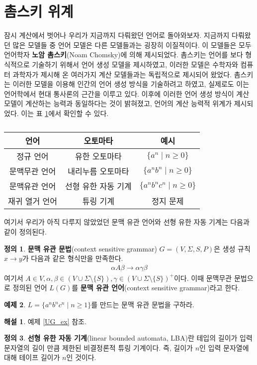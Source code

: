 \documentclass[b5paper, 11pt]{book}
\theoremstyle{definition}
\newtheorem{defn}{정의}[chapter]
\newtheorem{ex}[defn]{예제}
\newtheorem*{ans*}{해설}
\begin{document}
\section{촘스키 위계}
잠시 계산에서 벗어나 우리가 지금까지 다뤄왔던 언어로 돌아와보자. 지금까지 다뤄왔던 많은 모델들 중
언어 모델은 다른 모델들과는 굉장히 이질적이다. 이 모델들은 모두 
언어학자 \textbf{노암 촘스키}(Noam Chomsky)에 의해 제시되었다. 촘스키는 언어를 보다 형식적으로
기술하기 위해서 언어 생성 모델을 제시하였고, 이러한 모델은 수학자와 컴퓨터 과학자가 제시해 온 여러가지 계산 모델들과는 독립적으로 제시되어 왔었다. 촘스키는 이러한 모델을 이용해 인간의 언어 생성 방식을 기술하려고 하였고, 실제로도 이는 언어학에서 현대 통사론의 근간을 이루고 있다. 이후에 이러한 언어 생성 방식이 계산 모델이 계산하는 능력과 동일하다는 것이 밝혀졌고, 언어의 계산 능력적 위계가 제시되었다. 이는 표 \ref{chomsky hierarchy}에서 확인할 수 있다.
\begin{table}[h]
    \centering
    \begin{tabular}{|c|c|c|}
    \hline
    \textbf{언어} & \textbf{오토마타} & \textbf{예시} \\ \hline
    정규 언어       & 유한 오토마타       &   $\{ a^n \;\vert\; n\ge 0\}$    \\ \hline
    문맥무관 언어    & 내리누름 오토마타     & $\{ a^n b^n \;\vert\; n\ge 0\}$    \\ \hline
    문맥유관 언어    & 선형 유한 자동 기계   & $\{ a^n b^n c^n \;\vert\; n\ge 0\}$    \\ \hline
    재귀 열거 언어    & 튜링 기계         & 정지 문제  \\ \hline
    \end{tabular}
    \caption{}
    \label{chomsky hierarchy}
\end{table}
여기서 우리가 아직 다루지 않았었던 문맥 유관 언어와 선형 유한 자동 기계는 다음과 같이 정의된다. 
\begin{defn}
    \textbf{문맥 유관 문법}(context sensitive grammar) $G = (V, \Sigma, S, P)$은 생성 규칙
    $x \rightarrow y$가 다음과 같은 형식만을 만족한다.
    \begin{align*}
        \alpha A \beta \rightarrow \alpha \gamma \beta
    \end{align*}
    여기서 $A \in V, \alpha, \beta \in (V \cup \Sigma \setminus \{S\}), 
    \gamma \in (V \cup \Sigma \setminus \{S\})^+$이다.
    이때 문맥무관 문법으로 정의된 언어 $L(G)$를 \textbf{문맥 유관 언어}(context sensitive grammar)라고
    한다.
\end{defn}
\begin{ex}
    $L = \{ a^n b^n c^n \;\vert\; n \ge 1\}$를 만드는 문맥 유관 문법을 구하라. 
\end{ex}
\begin{ans*}
    예제 \ref{UG_ex} 참조.
\end{ans*}
\begin{defn}
    \textbf{선형 유한 자동 기계}(linear bounded automata, LBA)란 테입의 길이가 입력 문자열의 길이 만큼 제한된 비결정론적 튜링 기계이다. 즉, 길이가 $n$인 입력 문자열에 대해 테이프 길이가 $n$인 것이다.
\end{defn}
\end{document}
